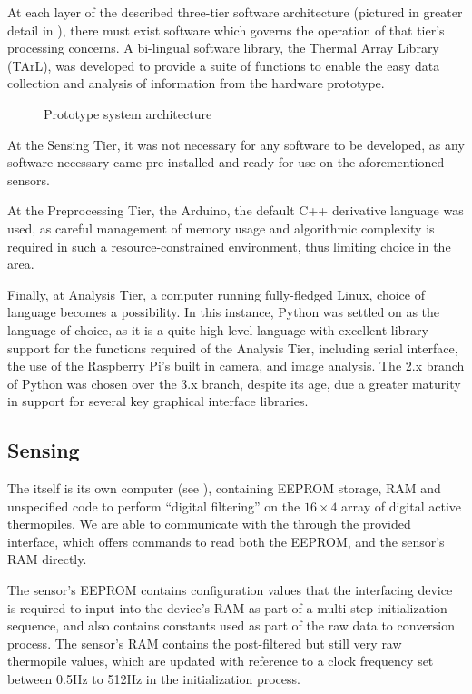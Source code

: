 \documentclass[../thesis/thesis.tex]{subfiles}
\begin{document}
At each layer of the described three-tier software architecture (pictured in greater detail in ), there must exist software which governs the operation of that tier's processing concerns. A bi-lingual software library, the Thermal Array Library (TArL), was developed to provide a suite of functions to enable the easy data collection and analysis of information from the hardware prototype.

\begin{figure}
\centering

\caption{Prototype system architecture}
\label{fig:pictures:protob-arch}
\end{figure}

At the Sensing Tier, it was not necessary for any software to be developed, as any software necessary came pre-installed and ready for use on the aforementioned sensors.

At the Preprocessing Tier, the Arduino, the default C++ derivative language was used, as careful management of memory usage and algorithmic complexity is required in such a resource-constrained environment, thus limiting choice in the area.

Finally, at Analysis Tier, a computer running fully-fledged Linux, choice of language becomes a possibility. In this instance, Python was settled on as the language of choice, as it is a quite high-level language with excellent library support for the functions required of the Analysis Tier, including serial interface, the use of the Raspberry Pi's built in camera, and image analysis. The 2.x branch of Python was chosen over the 3.x branch, despite its age, due a greater maturity in support for several key graphical interface libraries.

\subsection{Sensing}
The \mlx itself is its own computer (see ), containing EEPROM storage, RAM and unspecified code to perform ``digital filtering'' on the $16 \times 4$ array of digital active thermopiles. We are able to communicate with the \mlx through the provided \iic interface, which offers commands to read both the EEPROM, and the sensor's RAM directly. 

The sensor's EEPROM contains configuration values that the interfacing device is required to input into the device's RAM as part of a multi-step initialization sequence, and also contains constants used as part of the raw data to \dc conversion process. The sensor's RAM contains the post-filtered but still very raw thermopile values, which are updated with reference to a clock frequency set between 0.5Hz to 512Hz in the initialization process.
\end{document}
